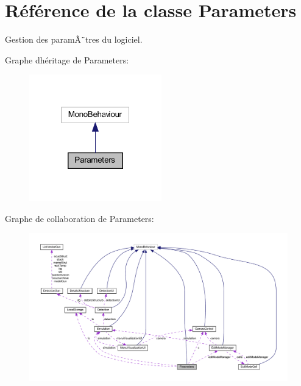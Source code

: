 \hypertarget{class_parameters}{}\section{Référence de la classe Parameters}
\label{class_parameters}


Gestion des paramÃ¨tres du logiciel.  




Graphe d\textquotesingle{}héritage de Parameters\+:\nopagebreak
\begin{figure}[H]
\begin{center}
\leavevmode
\includegraphics[width=163pt]{class_parameters__inherit__graph}
\end{center}
\end{figure}


Graphe de collaboration de Parameters\+:
\nopagebreak
\begin{figure}[H]
\begin{center}
\leavevmode
\includegraphics[width=350pt]{class_parameters__coll__graph}
\end{center}
\end{figure}
